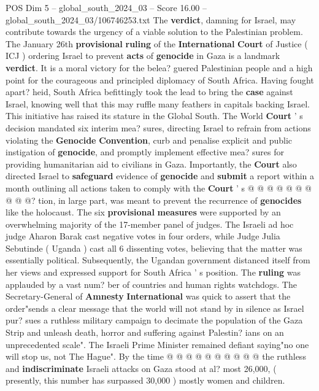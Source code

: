 \begin{textsample}{POS Dim 5 – global\_south\_2024\_03 – Score 16.00 – global\_south\_2024\_03/106746253.txt}  \label{ex:f5_pos_243}
The \textbf{verdict}, damning for Israel, may contribute towards the urgency of a viable solution to the Palestinian problem.
The January 26th \textbf{provisional} \textbf{ruling} of the \textbf{International} \textbf{Court} of Justice ( ICJ ) ordering Israel to prevent \textbf{acts} of \textbf{genocide} in Gaza is a landmark \textbf{verdict}.
It is a moral victory for the belea? guered Palestinian people and a high point for the courageous and principled diplomacy of South Africa.
Having fought apart? heid, South Africa befittingly took the lead to bring the \textbf{case} against Israel, knowing well that this may ruffle many feathers in capitals backing Israel.
This initiative has raised its stature in the Global South.
The World \textbf{Court} ' s decision mandated six interim mea? sures, directing Israel to refrain from actions violating the \textbf{Genocide} \textbf{Convention}, curb and penalise explicit and public instigation of \textbf{genocide}, and promptly implement effective mea? sures for providing humanitarian aid to civilians in Gaza.
Importantly, the \textbf{Court} also directed Israel to \textbf{safeguard} evidence of \textbf{genocide} and \textbf{submit} a report within a month outlining all actions taken to comply with the \textbf{Court} ' s @ @ @ @ @ @ @ @ @ @? tion, in large part, was meant to prevent the recurrence of \textbf{genocides} like the holocaust.
The six \textbf{provisional} \textbf{measures} were supported by an overwhelming majority of the 17-member panel of judges.
The Israeli ad hoc judge Aharon Barak cast negative votes in four orders, while Judge Julia Sebutinde ( Uganda ) cast all 6 dissenting votes, believing that the matter was essentially political.
Subsequently, the Ugandan government distanced itself from her views and expressed support for South Africa ' s position.
The \textbf{ruling} was applauded by a vast num? ber of countries and human rights watchdogs.
The Secretary-General of \textbf{Amnesty} \textbf{International} was quick to assert that the order"sends a clear message that the world will not stand by in silence as Israel pur? sues a ruthless military campaign to decimate the population of the Gaza Strip and unleash death, horror and suffering against Palestin? ians on an unprecedented scale".
The Israeli Prime Minister remained defiant saying"no one will stop us, not The Hague".
By the time @ @ @ @ @ @ @ @ @ @ the ruthless and \textbf{indiscriminate} Israeli attacks on Gaza stood at al? most 26,000, ( presently, this number has surpassed 30,000 ) mostly women and children.

\end{textsample}
